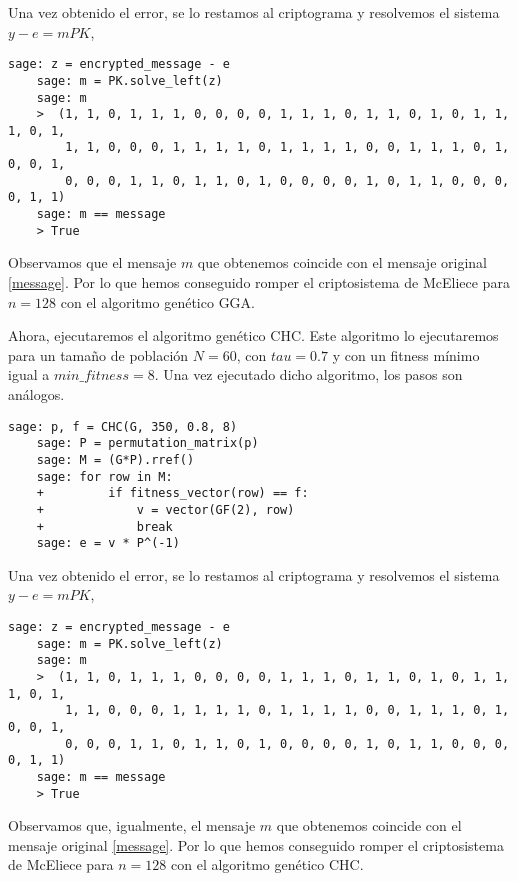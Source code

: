 \begin{exampleth}
    Una vez obtenido el error, se lo restamos al criptograma y resolvemos el sistema $y - e = mPK$,

    \begin{lstlisting}[gobble=4]
    sage: z = encrypted_message - e
    sage: m = PK.solve_left(z)
    sage: m
    >  (1, 1, 0, 1, 1, 1, 0, 0, 0, 0, 1, 1, 1, 0, 1, 1, 0, 1, 0, 1, 1, 1, 0, 1, 
        1, 1, 0, 0, 0, 1, 1, 1, 1, 0, 1, 1, 1, 1, 0, 0, 1, 1, 1, 0, 1, 0, 0, 1, 
        0, 0, 0, 1, 1, 0, 1, 1, 0, 1, 0, 0, 0, 0, 1, 0, 1, 1, 0, 0, 0, 0, 1, 1)
    sage: m == message
    > True
    \end{lstlisting}

    Observamos que el mensaje $m$ que obtenemos coincide con el mensaje original \eqref{message}. Por lo que hemos conseguido romper el criptosistema de McEliece para $n = 128$ con el algoritmo genético GGA.

    Ahora, ejecutaremos el algoritmo genético CHC. Este algoritmo lo ejecutaremos para un tamaño de población $N = 60$, con $tau = 0.7$ y con un fitness mínimo igual a $min\_fitness = 8$. Una vez ejecutado dicho algoritmo, los pasos son análogos.

    \begin{lstlisting}[gobble=4]
    sage: p, f = CHC(G, 350, 0.8, 8)
    sage: P = permutation_matrix(p)
    sage: M = (G*P).rref()
    sage: for row in M:
    +         if fitness_vector(row) == f:
    +             v = vector(GF(2), row)
    +             break
    sage: e = v * P^(-1)
    \end{lstlisting}

    Una vez obtenido el error, se lo restamos al criptograma y resolvemos el sistema $y - e = mPK$,

    \begin{lstlisting}[gobble=4]
    sage: z = encrypted_message - e
    sage: m = PK.solve_left(z)
    sage: m
    >  (1, 1, 0, 1, 1, 1, 0, 0, 0, 0, 1, 1, 1, 0, 1, 1, 0, 1, 0, 1, 1, 1, 0, 1,
        1, 1, 0, 0, 0, 1, 1, 1, 1, 0, 1, 1, 1, 1, 0, 0, 1, 1, 1, 0, 1, 0, 0, 1, 
        0, 0, 0, 1, 1, 0, 1, 1, 0, 1, 0, 0, 0, 0, 1, 0, 1, 1, 0, 0, 0, 0, 1, 1)
    sage: m == message
    > True
    \end{lstlisting}

    Observamos que, igualmente, el mensaje $m$ que obtenemos coincide con el mensaje original \eqref{message}. Por lo que hemos conseguido romper el criptosistema de McEliece para $n = 128$ con el algoritmo genético CHC.
\end{exampleth}